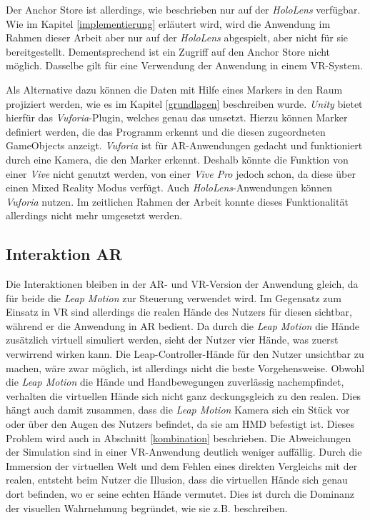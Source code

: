 Der Anchor Store ist allerdings, wie beschrieben nur auf der \textit{HoloLens} verfügbar. Wie im Kapitel \ref{implementierung} erläutert wird, wird die Anwendung im Rahmen dieser Arbeit aber nur auf der \textit{HoloLens} abgespielt, aber nicht für sie bereitgestellt. Dementsprechend ist ein Zugriff auf den Anchor Store nicht möglich. Dasselbe gilt für eine Verwendung der Anwendung in einem VR-System.

Als Alternative dazu können die Daten mit Hilfe eines Markers in den Raum projiziert werden, wie es im Kapitel \ref{grundlagen} beschreiben wurde. \textit{Unity} bietet hierfür das \textit{Vuforia}-Plugin, welches genau das umsetzt. Hierzu können Marker definiert werden, die das Programm erkennt und die diesen zugeordneten GameObjects anzeigt. 
\textit{Vuforia} ist für AR-Anwendungen gedacht und funktioniert durch eine Kamera, die den Marker erkennt. Deshalb könnte die Funktion von einer \textit{Vive} nicht genutzt werden, von einer \textit{Vive Pro} jedoch schon, da diese über einen Mixed Reality Modus verfügt. Auch \textit{HoloLens}-Anwendungen können \textit{Vuforia} nutzen. 
Im zeitlichen Rahmen der Arbeit konnte dieses Funktionalität allerdings nicht mehr umgesetzt werden.

\subsection{Interaktion AR}

Die Interaktionen bleiben in der AR- und VR-Version der Anwendung gleich, da für beide die \textit{Leap Motion} zur Steuerung verwendet wird.
Im Gegensatz zum Einsatz in VR sind allerdings die realen Hände des Nutzers für diesen sichtbar, während er die Anwendung in AR bedient. Da durch die \textit{Leap Motion} die Hände zusätzlich virtuell simuliert werden, sieht der Nutzer vier Hände, was zuerst verwirrend wirken kann. 
Die Leap-Controller-Hände für den Nutzer unsichtbar zu machen, wäre zwar möglich, ist allerdings nicht die beste Vorgehensweise. Obwohl die \textit{Leap Motion} die Hände und Handbewegungen zuverlässig nachempfindet, verhalten die virtuellen Hände sich nicht ganz deckungsgleich zu den realen. Dies hängt auch damit zusammen, dass die \textit{Leap Motion} Kamera sich ein Stück vor oder über den Augen des Nutzers befindet, da sie am HMD befestigt ist. Dieses Problem wird auch in Abschnitt \ref{kombination} beschrieben.
Die Abweichungen der Simulation sind in einer VR-Anwendung deutlich weniger auffällig. Durch die Immersion der virtuellen Welt und dem Fehlen eines direkten Vergleichs mit der realen, entsteht beim Nutzer die Illusion, dass die virtuellen Hände sich genau dort befinden, wo er seine echten Hände vermutet. Dies ist durch die Dominanz der visuellen Wahrnehmung begründet, wie sie z.B. \cite{Azmandian16} beschreiben.

